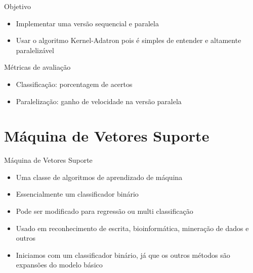\documentclass{beamer}
\begin{document}
\begin{frame}{Objetivo}
  \begin{itemize}
  \item {
    Implementar uma versão sequencial e paralela
  }
  \item {   
    Usar o algoritmo Kernel-Adatron pois é simples de entender e altamente paralelizável
  }
  \end{itemize}
\end{frame}

\begin{frame}{Métricas de avaliação}
  \begin{itemize}
  \item {
    Classificação: porcentagem de acertos
  }
  \item {   
    Paralelização: ganho de velocidade na versão paralela
  }
  \end{itemize}
\end{frame}

\section{Máquina de Vetores Suporte}

\begin{frame}{Máquina de Vetores Suporte}
  \begin{itemize}
  \item {
    Uma classe de algoritmos de aprendizado de máquina
  }
  \item {
    Essencialmente um classificador binário 
  }
  \item {
    Pode ser modificado para regressão ou multi classificação
  }
  \item {
    Usado em reconhecimento de escrita, bioinformática, mineração de dados e outros
  }
  \item {
    Iniciamos com um classificador binário, já que os outros métodos são expansões do modelo básico
  }
  \end{itemize}
\end{frame}
\end{document}
